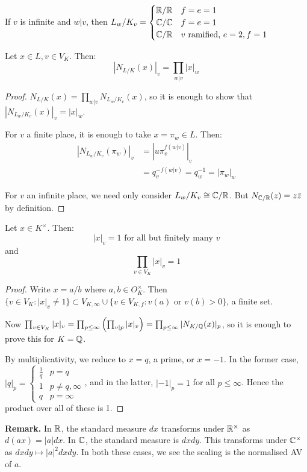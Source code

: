 \documentclass[10pt,a4paper]{article}
\begin{document}
If $v$ is infinite and $w|v$, then $L_w/K_v = \begin{cases} \mathbb{R}/\mathbb{R} & f= e=1\\ \mathbb{C}/\mathbb{C} & f=e=1 \\\mathbb{C}/\mathbb{R} & v\text{ ramified, } e=2,f=1\end{cases}$
\begin{proposition}
  Let $x \in L, v \in V_K$. Then:
  \[|N_{L/K}(x)|_v = \prod_{w|v}|x|_w\]
\end{proposition}
\begin{proof}
  $N_{L/K}(x) = \prod_{w|v}N_{L_w/K_v}(x)$, so it is enough to show that $|N_{L_w/K_v}(x)|_v = |x|_w$.

  For $v$ a finite place, it is enough to take $x = \pi_w \in L$. Then:
  \begin{align*}
    |N_{L_w/K_v}(\pi_w)|_v &= |u\pi_v^{f(w|v)}|_v\\
    &= q_v^{-f(w|v)} = q_w^{-1} = |\pi_w|_w
  \end{align*}

  For $v$ an infinite place, we need only consider $L_w/K_v \cong \mathbb{C}/\mathbb{R}$. But $N_{\mathbb{C}/\mathbb{R}}(z) = z\bar{z}$ by definition.
\end{proof}
\begin{theorem}
  Let $x \in K^\times$. Then:
  \[|x|_v = 1 \text{ for all but finitely many $v$}\]
  and
  \[\prod_{v\in V_K}|x|_v = 1\]
\end{theorem}
\begin{proof}
  Write $x = a/b$ where $a,b \in O_K^\times$. Then $\{v \in V_K: |x|_v \neq 1\}\subset V_{K, \infty} \cup\{v \in V_{K,f} : v(a)\text{ or }v(b) >0\}$, a finite set.

  Now $\prod_{v\in V_K}|x|_v = \prod_{p\leq \infty} \left(\prod_{v|p}|x|_v\right) = \prod_{p\leq \infty}|N_{K/\mathbb{Q}}(x)|_p$, so it is enough to prove this for $K= \mathbb{Q}$.

  By multiplicativity, we reduce to $x = q$, a prime, or $x= -1$. In the former case, $|q|_p = \begin{cases} \frac1q & p =q\\1 & p \neq q, \infty\\ q& p=\infty \end{cases}$, and in the latter, $|-1|_p = 1$ for all $p \leq \infty$. Hence the product over all of these is 1.
\end{proof}
\textbf{Remark.} In $\mathbb{R}$, the standard measure $dx$ transforms under $\mathbb{R}^\times$ as $d(ax) = |a|dx$. In $\mathbb{C}$, the standard measure is $dxdy$. This transforms under $\mathbb{C}^{\times}$ as $dxdy \mapsto |a|^2dxdy$. In both these cases, we see the scaling is the normalised AV of $a$.
\end{document}
